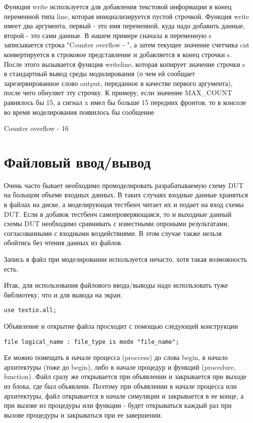 Функция write используется для добавления текстовой информации в конец переменной типа line, которая инициализируется пустой строчкой. Функция write имеет два аргумента, первый - это имя переменной, куда надо добавить данные, второй - это сами данные. В нашем примере сначала в переменную s записывается строка "Counter overflow - ", а затем текущее значение счетчика cnt конвертируется в строковое представление и добавляется в конец строчки s. После этого вызывается функция writeline, которая копирует значение строчки s в стандартный вывод среды модилирования (о чем ей сообщает зарезервированное слово output, переданное в качестве первого аргумента), после чего обнуляет эту строчку. К примеру, если значение MAX\_COUNT равнялось бы 15, а сигнал x имел бы больше 15 передних фронтов, то в консоле во время моделирования появилось бы сообщение 

Counter overflow - 16

\section{Файловый ввод/вывод}

Очень часто бывает необходимо промоделировать разрабатываемую схему DUT на больщом объеме входных данных. В таких случаях входные данные храняться в файлах на диске, а моделирующая тестбенч читает их и подает на вход схемы DUT. Если в добавок тестбенч самопроверяющаяся, то и выходные данный схемы DUT необходимо сравнивать с известными опроными результатами, согласованными с входными воздействиями. В этом случае также нельзя обойтись без чтения данных из файлов.

Запись в файл при моделировании используется нечасто, хотя такая возможность есть. 

Итак, для использования файлового ввода/выводы надо использовать туже библиотеку, что и для вывода на экран.

\begin{lstlisting}
use textio.all;
\end{lstlisting}

Объявление и открытие файла просходит с помощью следующей конструкции

\begin{lstlisting}
file logical_name : file_type is mode "file_name";
\end{lstlisting}

Ее можно помещать в начале процесса (proccess) до слова begin, в начало архитектуры (тоже до begin), либо в начале процедур и функций (procedure, function). Файл сразу же открывается при объявлении и закрывается при выходе из блока, где был объявлени. Поэтому при объявлении в начале процесса или архитектуры, файл открывается в начале симуляции и закрывается в ее конце, а при вызове из процедуры или функции - будет открываться каждый раз при вызове процедуры и закрываться при ее завершении. 


